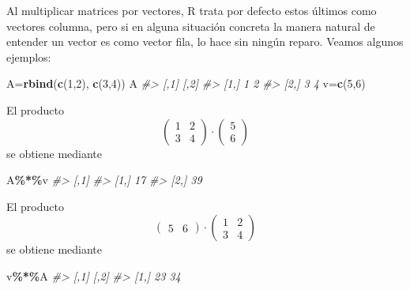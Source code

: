 \documentclass[
]{book}
\newenvironment{Shaded}{\begin{snugshade}}{\end{snugshade}}
\newcommand{\CommentTok}[1]{\textcolor[rgb]{0.56,0.35,0.01}{\textit{#1}}}
\newcommand{\DecValTok}[1]{\textcolor[rgb]{0.00,0.00,0.81}{#1}}
\newcommand{\KeywordTok}[1]{\textcolor[rgb]{0.13,0.29,0.53}{\textbf{#1}}}
\newcommand{\NormalTok}[1]{#1}
\newcommand{\OperatorTok}[1]{\textcolor[rgb]{0.81,0.36,0.00}{\textbf{#1}}}
\theoremstyle{definition}
\theoremstyle{definition}
\theoremstyle{definition}
\theoremstyle{remark}
\begin{document}
Al multiplicar matrices por vectores, R trata por defecto estos últimos como vectores columna, pero si en alguna situación concreta la manera natural de entender un vector es como vector fila, lo hace sin ningún reparo. Veamos algunos ejemplos:

\begin{Shaded}
\begin{Highlighting}[]
\NormalTok{A=}\KeywordTok{rbind}\NormalTok{(}\KeywordTok{c}\NormalTok{(}\DecValTok{1}\NormalTok{,}\DecValTok{2}\NormalTok{), }\KeywordTok{c}\NormalTok{(}\DecValTok{3}\NormalTok{,}\DecValTok{4}\NormalTok{))}
\NormalTok{A}
\CommentTok{\#\textgreater{}      [,1] [,2]}
\CommentTok{\#\textgreater{} [1,]    1    2}
\CommentTok{\#\textgreater{} [2,]    3    4}
\NormalTok{v=}\KeywordTok{c}\NormalTok{(}\DecValTok{5}\NormalTok{,}\DecValTok{6}\NormalTok{)}
\end{Highlighting}
\end{Shaded}

El producto
\[
\left(\begin{array}{cc}
1 & 2 \\ 3 & 4\end{array}
\right)\cdot \left(\begin{array}{c}
5\\ 6\end{array}
\right)
\]
se obtiene mediante

\begin{Shaded}
\begin{Highlighting}[]
\NormalTok{A}\OperatorTok{\%*\%}\NormalTok{v}
\CommentTok{\#\textgreater{}      [,1]}
\CommentTok{\#\textgreater{} [1,]   17}
\CommentTok{\#\textgreater{} [2,]   39}
\end{Highlighting}
\end{Shaded}

El producto
\[
\left(\begin{array}{cc}
5 & 6\end{array}\right)\cdot\left(\begin{array}{cc}
1 & 2 \\ 3 & 4\end{array}
\right)
\]
se obtiene mediante

\begin{Shaded}
\begin{Highlighting}[]
\NormalTok{v}\OperatorTok{\%*\%}\NormalTok{A}
\CommentTok{\#\textgreater{}      [,1] [,2]}
\CommentTok{\#\textgreater{} [1,]   23   34}
\end{Highlighting}
\end{Shaded}
\end{document}
